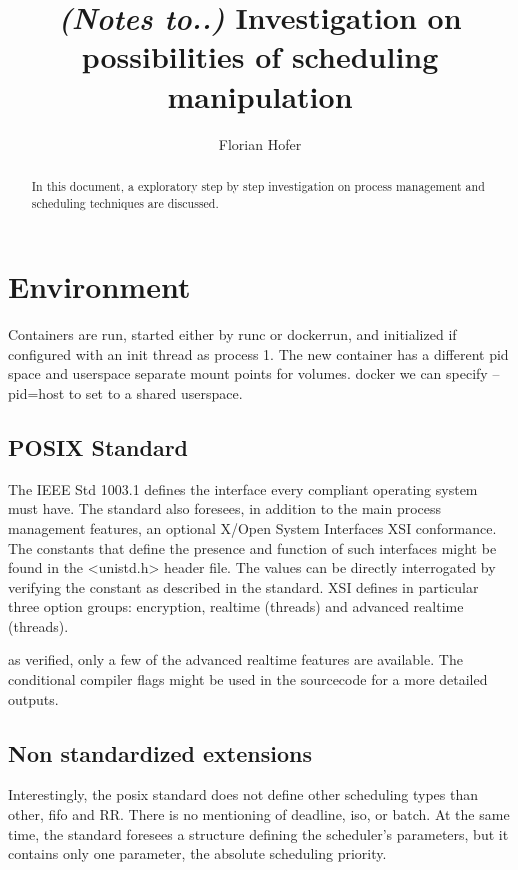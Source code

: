 \documentclass[]{scrartcl}
\title{\textit{(Notes to..) } Investigation on possibilities of scheduling manipulation}
\author{Florian Hofer}
\begin{document}
\maketitle

\begin{abstract}
In this document, a exploratory step by step investigation on process management and scheduling techniques are discussed.
\end{abstract}

\section{Environment}

Containers are run, started either by runc or dockerrun, and initialized if configured with an init thread as process 1. 
The new container has a different pid space and userspace
separate mount points for volumes. docker we can specify --pid=host to set to a shared userspace.

\subsection{POSIX Standard}

The IEEE Std 1003.1 defines the interface every compliant operating system must have. The standard also foresees, in addition to the main process management features, an optional X/Open System Interfaces XSI conformance.
The constants that define the presence and function of such interfaces might be found in the <unistd.h> header file. 
The values can be directly interrogated by verifying the constant as described in the standard.
XSI defines in particular three option groups: encryption, realtime (threads) and advanced realtime (threads). 

as verified, only a few of the advanced realtime features are available. 
The conditional compiler flags might be used in the sourcecode for a more detailed outputs. 

\subsection{Non standardized extensions}

Interestingly, the posix standard does not define other scheduling types than other, fifo and RR. 
There is no mentioning of deadline, iso, or batch. 
At the same time, the standard foresees a structure defining the scheduler's parameters, but it contains only one parameter, the absolute scheduling priority.
\end{document}
